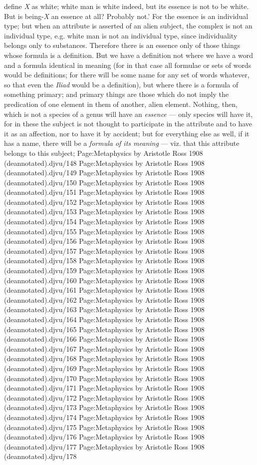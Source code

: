 define \emph{X} as white; white man is white indeed, but its essence is not to be white. But is being-\emph{X} an essence at all? Probably not.' For the essence is an individual type; but when an attribute is asserted of an alien subject, the complex is not an individual type, e.g. white man is not an individual type, since individuality belongs only to substances. Therefore there is an essence only of those things whose formula is a definition. But we have a definition not where we have a word and a formula identical in meaning (for in that case all formulae or sets of words would be definitions; for there will be some name for any set of words whatever, so that even the \emph{Iliad} would be a definition), but where there is a formula of something primary; and primary things are those which do not imply the predication of one element in them of another, alien element. Nothing, then, which is not a species of a genus will have an \emph{essence} — only species will have it, for in these the subject is not thought to participate in the attribute and to have it as an affection, nor to have it by accident; but for everything else as well, if it has a name, there will be a \emph{formula of its meaning} — viz. that this attribute belongs to this subject; Page:Metaphysics by Aristotle Ross 1908 (deannotated).djvu/148 Page:Metaphysics by Aristotle Ross 1908 (deannotated).djvu/149 Page:Metaphysics by Aristotle Ross 1908 (deannotated).djvu/150 Page:Metaphysics by Aristotle Ross 1908 (deannotated).djvu/151 Page:Metaphysics by Aristotle Ross 1908 (deannotated).djvu/152 Page:Metaphysics by Aristotle Ross 1908 (deannotated).djvu/153 Page:Metaphysics by Aristotle Ross 1908 (deannotated).djvu/154 Page:Metaphysics by Aristotle Ross 1908 (deannotated).djvu/155 Page:Metaphysics by Aristotle Ross 1908 (deannotated).djvu/156 Page:Metaphysics by Aristotle Ross 1908 (deannotated).djvu/157 Page:Metaphysics by Aristotle Ross 1908 (deannotated).djvu/158 Page:Metaphysics by Aristotle Ross 1908 (deannotated).djvu/159 Page:Metaphysics by Aristotle Ross 1908 (deannotated).djvu/160 Page:Metaphysics by Aristotle Ross 1908 (deannotated).djvu/161 Page:Metaphysics by Aristotle Ross 1908 (deannotated).djvu/162 Page:Metaphysics by Aristotle Ross 1908 (deannotated).djvu/163 Page:Metaphysics by Aristotle Ross 1908 (deannotated).djvu/164 Page:Metaphysics by Aristotle Ross 1908 (deannotated).djvu/165 Page:Metaphysics by Aristotle Ross 1908 (deannotated).djvu/166 Page:Metaphysics by Aristotle Ross 1908 (deannotated).djvu/167 Page:Metaphysics by Aristotle Ross 1908 (deannotated).djvu/168 Page:Metaphysics by Aristotle Ross 1908 (deannotated).djvu/169 Page:Metaphysics by Aristotle Ross 1908 (deannotated).djvu/170 Page:Metaphysics by Aristotle Ross 1908 (deannotated).djvu/171 Page:Metaphysics by Aristotle Ross 1908 (deannotated).djvu/172 Page:Metaphysics by Aristotle Ross 1908 (deannotated).djvu/173 Page:Metaphysics by Aristotle Ross 1908 (deannotated).djvu/174 Page:Metaphysics by Aristotle Ross 1908 (deannotated).djvu/175 Page:Metaphysics by Aristotle Ross 1908 (deannotated).djvu/176 Page:Metaphysics by Aristotle Ross 1908 (deannotated).djvu/177 Page:Metaphysics by Aristotle Ross 1908 (deannotated).djvu/178

